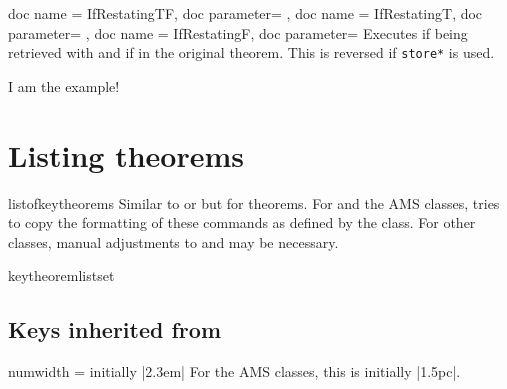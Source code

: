 \documentclass{ltxdoc}
\begin{document}
\begin{docCommands}
  {
    {
      doc name = IfRestatingTF,
      doc parameter=
    },
    {
      doc name = IfRestatingT,
      doc parameter=
    },
    {
      doc name = IfRestatingF,
      doc parameter=
    }
  }
Executes  if being retrieved with  and  if in the original theorem. This is reversed if \texttt{store*} is used.

\begin{keythmscode}[]
\begin{example}[store=hmm]
I am the
example!
\end{example}

\end{keythmscode}

\end{docCommands}

\section{Listing theorems}

\begin{docCommand}{listofkeytheorems}
  {}
Similar to  or  but for theorems.
For  and the AMS classes,  tries to copy the formatting of these commands as defined by the class.
For other classes, manual adjustments to  and  may be necessary.
\end{docCommand}

\begin{docCommand}{keytheoremlistset}
  {}

\end{docCommand}

\begin{keythmscode}[]
\listofkeytheorems
\end{keythmscode}

\subsection{Keys inherited from }

\begin{docKey}{numwidth}
  {=}
  {initially |2.3em|}
For the AMS classes, this is initially |1.5pc|.
\end{docKey}
\end{document}
